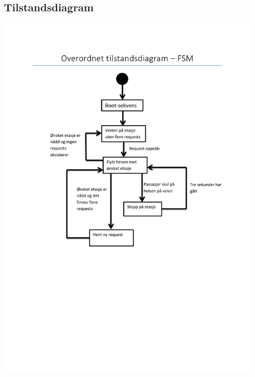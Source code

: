 \documentclass[10pt,a4paper]{article}
\begin{document}
\subsection{Tilstandsdiagram}
\includegraphics[scale=0.75]{overordnet_tilstandsdiagram.pdf}
\\
\end{document}
